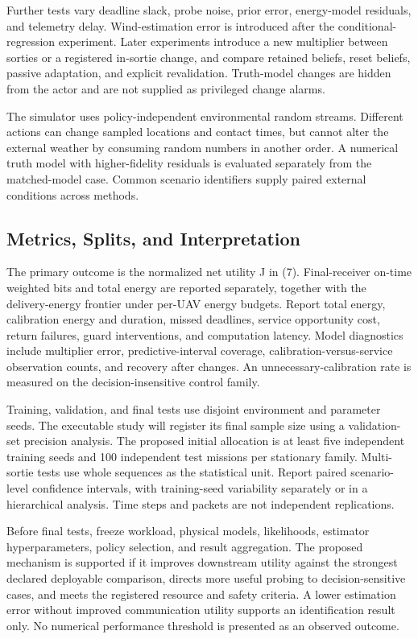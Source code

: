 \documentclass[10pt,twocolumn,letterpaper]{article}
\begin{document}
Further tests vary deadline slack, probe noise, prior error, energy-model residuals, and telemetry delay. Wind-estimation error is introduced after the conditional-regression experiment. Later experiments introduce a new multiplier between sorties or a registered in-sortie change, and compare retained beliefs, reset beliefs, passive adaptation, and explicit revalidation. Truth-model changes are hidden from the actor and are not supplied as privileged change alarms.

The simulator uses policy-independent environmental random streams. Different actions can change sampled locations and contact times, but cannot alter the external weather by consuming random numbers in another order. A numerical truth model with higher-fidelity residuals is evaluated separately from the matched-model case. Common scenario identifiers supply paired external conditions across methods.

\subsection{Metrics, Splits, and Interpretation}
The primary outcome is the normalized net utility J in (7). Final-receiver on-time weighted bits and total energy are reported separately, together with the delivery-energy frontier under per-UAV energy budgets. Report total energy, calibration energy and duration, missed deadlines, service opportunity cost, return failures, guard interventions, and computation latency. Model diagnostics include multiplier error, predictive-interval coverage, calibration-versus-service observation counts, and recovery after changes. An unnecessary-calibration rate is measured on the decision-insensitive control family.

Training, validation, and final tests use disjoint environment and parameter seeds. The executable study will register its final sample size using a validation-set precision analysis. The proposed initial allocation is at least five independent training seeds and 100 independent test missions per stationary family. Multi-sortie tests use whole sequences as the statistical unit. Report paired scenario-level confidence intervals, with training-seed variability separately or in a hierarchical analysis. Time steps and packets are not independent replications.

Before final tests, freeze workload, physical models, likelihoods, estimator hyperparameters, policy selection, and result aggregation. The proposed mechanism is supported if it improves downstream utility against the strongest declared deployable comparison, directs more useful probing to decision-sensitive cases, and meets the registered resource and safety criteria. A lower estimation error without improved communication utility supports an identification result only. No numerical performance threshold is presented as an observed outcome.
\end{document}
